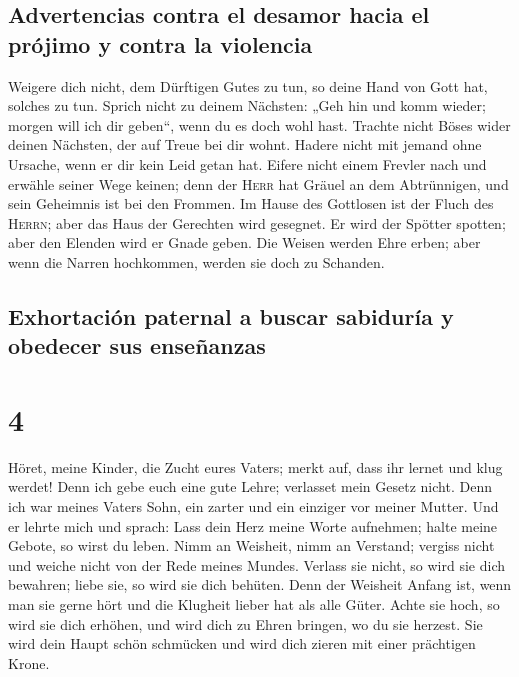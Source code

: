 \hypertarget{advertencias-contra-el-desamor-hacia-el-pruxf3jimo-y-contra-la-violencia}{%
\subsection{Advertencias contra el desamor hacia el prójimo y contra la
violencia}\label{advertencias-contra-el-desamor-hacia-el-pruxf3jimo-y-contra-la-violencia}}

 Weigere dich nicht, dem Dürftigen Gutes zu tun, so deine
Hand von Gott hat, solches zu tun.  Sprich nicht zu
deinem Nächsten: „Geh hin und komm wieder; morgen will ich dir geben``,
wenn du es doch wohl hast.  Trachte nicht Böses wider
deinen Nächsten, der auf Treue bei dir wohnt.  Hadere
nicht mit jemand ohne Ursache, wenn er dir kein Leid getan hat.
 Eifere nicht einem Frevler nach und erwähle seiner Wege
keinen;  denn der \textsc{Herr} hat Gräuel an dem
Abtrünnigen, und sein Geheimnis ist bei den Frommen.  Im
Hause des Gottlosen ist der Fluch des \textsc{Herrn}; aber das Haus der
Gerechten wird gesegnet.  Er wird der Spötter spotten;
aber den Elenden wird er Gnade geben.  Die Weisen werden
Ehre erben; aber wenn die Narren hochkommen, werden sie doch zu
Schanden.

\hypertarget{exhortaciuxf3n-paternal-a-buscar-sabiduruxeda-y-obedecer-sus-enseuxf1anzas}{%
\subsection{Exhortación paternal a buscar sabiduría y obedecer sus
enseñanzas}\label{exhortaciuxf3n-paternal-a-buscar-sabiduruxeda-y-obedecer-sus-enseuxf1anzas}}

\hypertarget{section-3}{%
\section{4}\label{section-3}}

 Höret, meine Kinder, die Zucht eures Vaters; merkt auf,
dass ihr lernet und klug werdet!  Denn ich gebe euch eine
gute Lehre; verlasset mein Gesetz nicht.  Denn ich war
meines Vaters Sohn, ein zarter und ein einziger vor meiner Mutter.
 Und er lehrte mich und sprach: Lass dein Herz meine Worte
aufnehmen; halte meine Gebote, so wirst du leben.  Nimm an
Weisheit, nimm an Verstand; vergiss nicht und weiche nicht von der Rede
meines Mundes.  Verlass sie nicht, so wird sie dich
bewahren; liebe sie, so wird sie dich behüten.  Denn der
Weisheit Anfang ist, wenn man sie gerne hört und die Klugheit lieber hat
als alle Güter.  Achte sie hoch, so wird sie dich erhöhen,
und wird dich zu Ehren bringen, wo du sie herzest.  Sie
wird dein Haupt schön schmücken und wird dich zieren mit einer
prächtigen Krone.


